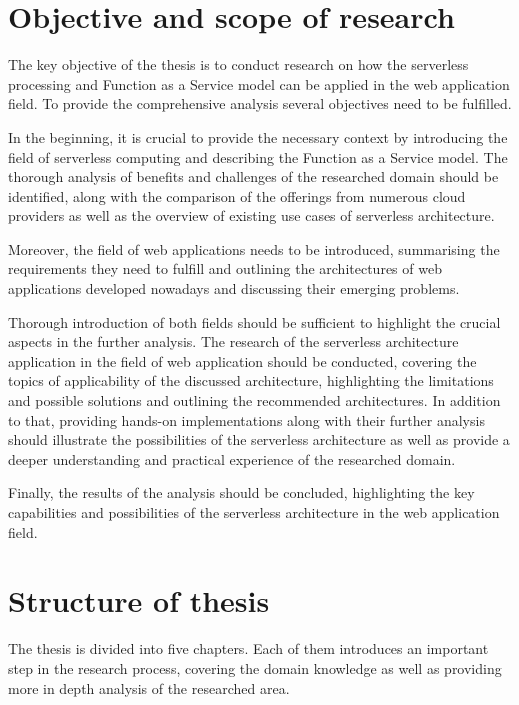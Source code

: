 \section{Objective and scope of research}

The key objective of the thesis is to conduct research on how the serverless processing and Function as a Service model can be applied in the web application field.
To provide the comprehensive analysis several objectives need to be fulfilled.

In the beginning, it is crucial to provide the necessary context by introducing the field of serverless computing and describing the Function as a Service model.
The thorough analysis of benefits and challenges of the researched domain should be identified, along with the comparison of the offerings from numerous cloud providers as well as the overview of existing use cases of serverless architecture.

Moreover, the field of web applications needs to be introduced, summarising the requirements they need to fulfill and outlining the architectures of web applications developed nowadays and discussing their emerging problems.

Thorough introduction of both fields should be sufficient to highlight the crucial aspects in the further analysis.
The research of the serverless architecture application in the field of web application should be conducted, covering the topics of applicability of the discussed architecture,
highlighting the limitations and possible solutions and outlining the recommended architectures.
In addition to that, providing hands-on implementations along with their further analysis should illustrate the possibilities of the serverless architecture as well as provide a deeper understanding and practical experience of the researched domain.

Finally, the results of the analysis should be concluded, highlighting the key capabilities and possibilities of the serverless architecture in the web application field.

\section{Structure of thesis}

The thesis is divided into five chapters. Each of them introduces an important step in the research process, covering the domain knowledge as well as providing more in depth analysis of the researched area.


